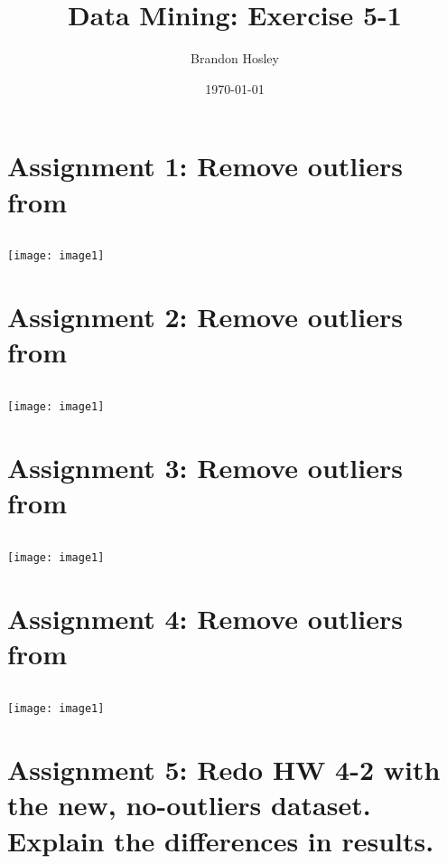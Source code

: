 \documentclass[]{article}
\title{Data Mining: Exercise 5-1}
\author{Brandon Hosley}
\date{\today}
\begin{document}
\maketitle

\section*{Assignment 1: Remove outliers from }

\begin{verbatim}
\end{verbatim}
\texttt{[image: image1]}


\section*{Assignment 2: Remove outliers from }

\begin{verbatim}
\end{verbatim}
\texttt{[image: image1]}


\section*{Assignment 3: Remove outliers from }

\begin{verbatim}
\end{verbatim}
\texttt{[image: image1]}


\section*{Assignment 4: Remove outliers from }

\begin{verbatim}
\end{verbatim}
\texttt{[image: image1]}


\section*{Assignment 5: Redo HW 4-2 with the new, no-outliers dataset. Explain the differences in results.}
\end{document}
